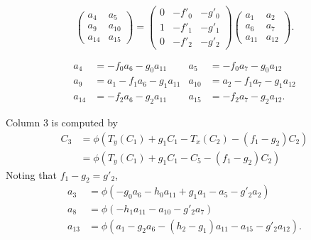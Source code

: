 \[ 
  \begin{pmatrix}
    a_4    & a_5    \\
    a_9    & a_{10} \\
    a_{14} & a_{15}
  \end{pmatrix} = 
  \begin{pmatrix}
    0 & -f'_0 & -g'_0 \\
    1 & -f'_1 & -g'_1 \\
    0 & -f'_2 & -g'_2
  \end{pmatrix}
  \begin{pmatrix}
    a_1    & a_2    \\
    a_6    & a_7    \\
    a_{11} & a_{12}
  \end{pmatrix}.
\]

\begin{align*}
  a_4    &=     - f_0a_6 - g_0a_{11} & a_5    &=     - f_0a_7 - g_0a_{12} \\
  a_9    &= a_1 - f_1a_6 - g_1a_{11} & a_{10} &= a_2 - f_1a_7 - g_1a_{12} \\
  a_{14} &=     - f_2a_6 - g_2a_{11} & a_{15} &=     - f_2a_7 - g_2a_{12}.
\end{align*}

Column 3 is computed by
\begin{align*}
  C_3 &= \phi \left( T_y(C_1) + g_1C_1 - T_x(C_2) - (f_1 - g_2)C_2 \right) \\
      &= \phi \left( T_y(C_1) + g_1C_1 - C_5 - (f_1 - g_2)C_2 \right)
\end{align*}
Noting that $f_1 - g_2 = g'_2$,
\begin{align*}
  a_3    &= \phi \left(     - g_0a_6 - h_0a_{11} + g_1a_1    - a_5    - g'_2a_2    \right) \\
  a_8    &= \phi \left(              - h_1a_{11}             - a_{10} - g'_2a_7    \right) \\
  a_{13} &= \phi \left( a_1 - g_2a_6 - (h_2 - g_1)a_{11}     - a_{15} - g'_2a_{12} \right) .
\end{align*}
\begin{comment}
\begin{align*}
  a_3    &= \phi \left(     - g_0a_6 - h_0a_{11} + g_1a_1    - a_5    - (f_1 - g_2)a_2    \right) \\
  a_8    &= \phi \left(              - h_1a_{11}             - a_{10} - (f_1 - g_2)a_7    \right) \\
  a_{13} &= \phi \left( a_1 - g_2a_6 - (h_2 - g_1)a_{11}     - a_{15} - (f_1 - g_2)a_{12} \right) .
\end{align*}
\end{comment}

